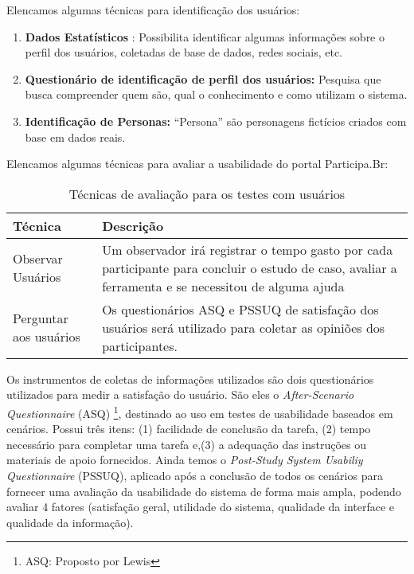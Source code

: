 Elencamos algumas técnicas para identificação dos usuários:

\begin{enumerate}
\item \textbf{Dados Estatísticos} : Possibilita identificar algumas informações sobre o perfil dos usuários, coletadas de base de dados, redes sociais, etc.

\item \textbf{Questionário de identificação de perfil dos usuários:} Pesquisa que busca compreender quem são, qual o conhecimento e como utilizam o sistema. 

\item \textbf{Identificação de Personas:} “Persona” são personagens fictícios criados com base em dados reais.  
\end{enumerate}

Elencamos algumas técnicas para avaliar a usabilidade do portal Participa.Br:

\begin{table}[h]
\begin{tabular}{|l| p{5cm} |}
\hline
Técnica & Descrição \\ \hline
Observar Usuários & Um observador irá registrar o tempo 
gasto por cada participante para concluir o estudo de caso, 
avaliar a ferramenta e se necessitou de alguma ajuda    \\ \hline
Perguntar aos usuários & Os questionários ASQ e PSSUQ 
de satisfação dos usuários será utilizado 
para coletar as opiniões dos participantes.\\ \hline
\end{tabular}
\caption{Técnicas de avaliação para os testes com usuários}
\end{table}

Os instrumentos de coletas de informações utilizados são dois questionários utilizados para medir a satisfação do usuário.
%
São eles o \textit{After-Scenario Questionnaire} (ASQ) \footnote{ASQ: Proposto por Lewis}, destinado ao uso em testes de usabilidade baseados em cenários. Possui três itens: (1) facilidade de conclusão da tarefa, (2) tempo necessário para completar uma tarefa e,(3) a adequação das instruções ou materiais de apoio fornecidos. Ainda temos o \textit{Post-Study System Usabiliy Questionnaire} (PSSUQ), aplicado após a conclusão de todos os cenários para fornecer uma avaliação  da usabilidade do sistema de forma mais ampla, podendo avaliar 4 fatores (satisfação geral, utilidade do sistema, qualidade da interface e qualidade da informação). 

